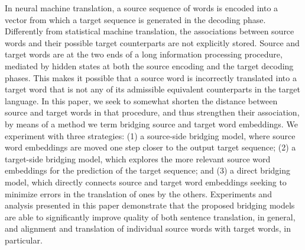 In neural machine translation, a source sequence of words is encoded into a vector from which a target sequence is generated in the decoding phase. Differently from statistical machine translation, the associations between source words and their possible target counterparts are not explicitly stored. Source and target words are at the two ends of a long information processing procedure, mediated by hidden states at both the source encoding and the target decoding phases. This makes it possible that a source word is incorrectly translated into a target word that is not any of its admissible equivalent counterparts in the target language. In this paper, we seek to somewhat shorten the distance between source and target words in that procedure, and thus strengthen their association, by means of a method we term bridging source and target word embeddings. We experiment with three strategies: (1) a source-side bridging model, where source word embeddings are moved one step closer to the output target sequence; (2) a target-side bridging model, which explores the more relevant source word embeddings for the prediction of the target sequence; and (3) a direct bridging model, which directly connects source and target word embeddings seeking to minimize errors in the translation of ones by the others. Experiments and analysis presented in this paper demonstrate that the proposed bridging models are able to significantly improve quality of both sentence translation, in general, and alignment and translation of individual source words with target words, in particular.
